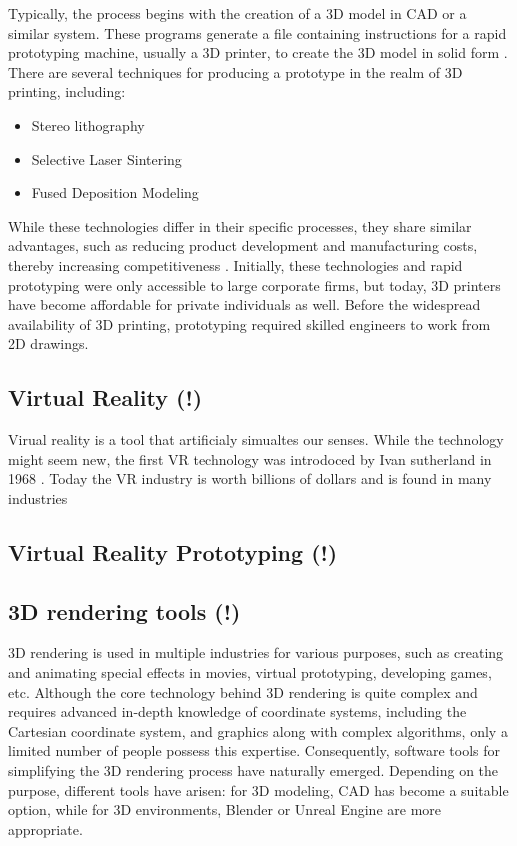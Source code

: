 Typically, the process begins with the creation of a 3D model in CAD or a similar system. 
These programs generate a file containing instructions for a rapid prototyping machine, usually 
a 3D printer, to create the 3D model in solid form \cite{sriharsha2018rapid}. There are several 
techniques for producing a prototype in the realm of 3D printing, including:
\begin{itemize}
    \item Stereo lithography
    \item Selective Laser Sintering
    \item Fused Deposition Modeling
\end{itemize}
While these technologies differ in their specific processes, they share similar advantages, such as 
reducing product development and manufacturing costs, thereby increasing competitiveness 
\cite{PHAM19981257}. Initially, these technologies and rapid prototyping were only accessible to 
large corporate firms, but today, 3D printers have become affordable for private individuals as well. 
Before the widespread availability of 3D printing, prototyping required skilled engineers to work from 
2D drawings.


\subsection{Virtual Reality (!)}
Virual reality  is a tool that artificialy simualtes our senses. While the technology might seem new, 
the first VR technology was introdoced by Ivan sutherland in 1968 \cite{lavalle2023virtual}. Today the VR
industry is worth billions of dollars and is found in many industries
\subsection{Virtual Reality Prototyping (!)}
\subsection{3D rendering tools (!)}
3D rendering is used in multiple industries for various purposes, such as creating and animating special 
effects in movies, virtual prototyping, developing games, etc. Although the core technology behind 3D 
rendering is quite complex and requires advanced in-depth knowledge of coordinate systems, including the 
Cartesian coordinate system, and graphics along with complex algorithms, only a limited number of people 
possess this expertise. Consequently, software tools for simplifying the 3D rendering process have naturally 
emerged. Depending on the purpose, different tools have arisen: for 3D modeling, CAD has become a suitable 
option, while for 3D environments, Blender or Unreal Engine are more appropriate.
